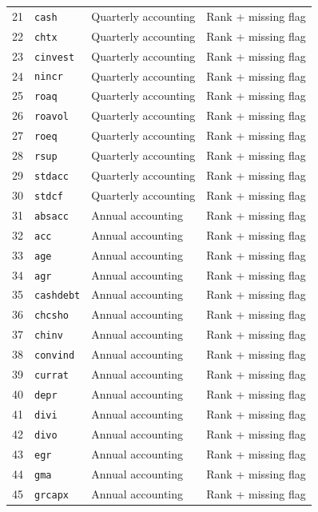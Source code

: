 {\begin{longtable}{@{}rlll@{}}
21 & \texttt{cash} & Quarterly accounting & Rank + missing flag\\
22 & \texttt{chtx} & Quarterly accounting & Rank + missing flag\\
23 & \texttt{cinvest} & Quarterly accounting & Rank + missing flag\\
24 & \texttt{nincr} & Quarterly accounting & Rank + missing flag\\
25 & \texttt{roaq} & Quarterly accounting & Rank + missing flag\\
26 & \texttt{roavol} & Quarterly accounting & Rank + missing flag\\
27 & \texttt{roeq} & Quarterly accounting & Rank + missing flag\\
28 & \texttt{rsup} & Quarterly accounting & Rank + missing flag\\
29 & \texttt{stdacc} & Quarterly accounting & Rank + missing flag\\
30 & \texttt{stdcf} & Quarterly accounting & Rank + missing flag\\
31 & \texttt{absacc} & Annual accounting & Rank + missing flag\\
32 & \texttt{acc} & Annual accounting & Rank + missing flag\\
33 & \texttt{age} & Annual accounting & Rank + missing flag\\
34 & \texttt{agr} & Annual accounting & Rank + missing flag\\
35 & \texttt{cashdebt} & Annual accounting & Rank + missing flag\\
36 & \texttt{chcsho} & Annual accounting & Rank + missing flag\\
37 & \texttt{chinv} & Annual accounting & Rank + missing flag\\
38 & \texttt{convind} & Annual accounting & Rank + missing flag\\
39 & \texttt{currat} & Annual accounting & Rank + missing flag\\
40 & \texttt{depr} & Annual accounting & Rank + missing flag\\
41 & \texttt{divi} & Annual accounting & Rank + missing flag\\
42 & \texttt{divo} & Annual accounting & Rank + missing flag\\
43 & \texttt{egr} & Annual accounting & Rank + missing flag\\
44 & \texttt{gma} & Annual accounting & Rank + missing flag\\
45 & \texttt{grcapx} & Annual accounting & Rank + missing flag\\

\end{longtable}}
